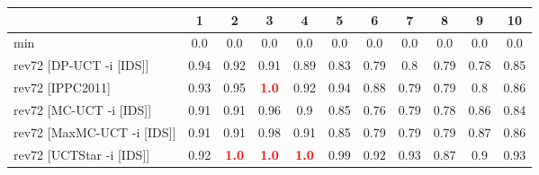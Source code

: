 \documentclass{article}
\begin{document}
\begin{tabular}{|l|r@{$\pm$}rr@{$\pm$}rr@{$\pm$}rr@{$\pm$}rr@{$\pm$}rr@{$\pm$}rr@{$\pm$}rr@{$\pm$}rr@{$\pm$}rr@{$\pm$}r|}
\hline

& \multicolumn{2}{c}{1}
& \multicolumn{2}{c}{2}
& \multicolumn{2}{c}{3}
& \multicolumn{2}{c}{4}
& \multicolumn{2}{c}{5}
& \multicolumn{2}{c}{6}
& \multicolumn{2}{c}{7}
& \multicolumn{2}{c}{8}
& \multicolumn{2}{c}{9}
& \multicolumn{2}{c|}{10}
\\
\hline
\hline
min
& \multicolumn{2}{c}{0.0}
& \multicolumn{2}{c}{0.0}
& \multicolumn{2}{c}{0.0}
& \multicolumn{2}{c}{0.0}
& \multicolumn{2}{c}{0.0}
& \multicolumn{2}{c}{0.0}
& \multicolumn{2}{c}{0.0}
& \multicolumn{2}{c}{0.0}
& \multicolumn{2}{c}{0.0}
& \multicolumn{2}{c|}{0.0}
\\
rev72 [DP-UCT -i [IDS]]
& \multicolumn{2}{c}{0.94}
& \multicolumn{2}{c}{0.92}
& \multicolumn{2}{c}{0.91}
& \multicolumn{2}{c}{0.89}
& \multicolumn{2}{c}{0.83}
& \multicolumn{2}{c}{0.79}
& \multicolumn{2}{c}{0.8}
& \multicolumn{2}{c}{0.79}
& \multicolumn{2}{c}{0.78}
& \multicolumn{2}{c|}{0.85}
\\
rev72 [IPPC2011]
& \multicolumn{2}{c}{0.93}
& \multicolumn{2}{c}{0.95}
& \multicolumn{2}{c}{\textbf{\textcolor{red}{1.0}}}
& \multicolumn{2}{c}{0.92}
& \multicolumn{2}{c}{0.94}
& \multicolumn{2}{c}{0.88}
& \multicolumn{2}{c}{0.79}
& \multicolumn{2}{c}{0.79}
& \multicolumn{2}{c}{0.8}
& \multicolumn{2}{c|}{0.86}
\\
rev72 [MC-UCT -i [IDS]]
& \multicolumn{2}{c}{0.91}
& \multicolumn{2}{c}{0.91}
& \multicolumn{2}{c}{0.96}
& \multicolumn{2}{c}{0.9}
& \multicolumn{2}{c}{0.85}
& \multicolumn{2}{c}{0.76}
& \multicolumn{2}{c}{0.79}
& \multicolumn{2}{c}{0.78}
& \multicolumn{2}{c}{0.86}
& \multicolumn{2}{c|}{0.84}
\\
rev72 [MaxMC-UCT -i [IDS]]
& \multicolumn{2}{c}{0.91}
& \multicolumn{2}{c}{0.91}
& \multicolumn{2}{c}{0.98}
& \multicolumn{2}{c}{0.91}
& \multicolumn{2}{c}{0.85}
& \multicolumn{2}{c}{0.79}
& \multicolumn{2}{c}{0.79}
& \multicolumn{2}{c}{0.79}
& \multicolumn{2}{c}{0.87}
& \multicolumn{2}{c|}{0.86}
\\
rev72 [UCTStar -i [IDS]]
& \multicolumn{2}{c}{0.92}
& \multicolumn{2}{c}{\textbf{\textcolor{red}{1.0}}}
& \multicolumn{2}{c}{\textbf{\textcolor{red}{1.0}}}
& \multicolumn{2}{c}{\textbf{\textcolor{red}{1.0}}}
& \multicolumn{2}{c}{0.99}
& \multicolumn{2}{c}{0.92}
& \multicolumn{2}{c}{0.93}
& \multicolumn{2}{c}{0.87}
& \multicolumn{2}{c}{0.9}
& \multicolumn{2}{c|}{0.93}
\\

\end{tabular}
\end{document}
